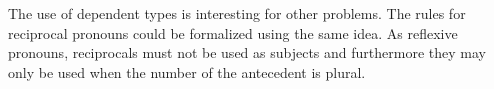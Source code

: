 \documentclass{report}
\begin{document}
The use of dependent types is interesting for other problems.
The rules for reciprocal pronouns could be formalized using the same idea. As reflexive pronouns, reciprocals
must not be used as subjects and furthermore they may only be used when the
number of the antecedent is plural.
%
%
%



\end{document}
